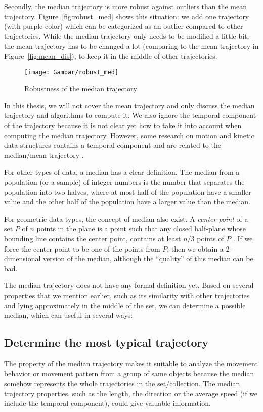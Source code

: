 Secondly, the median trajectory is more robust against outliers than the mean trajectory.
Figure~\ref{fig:robust_med} shows this situation: we add one trajectory (with purple color) which can be categorized as an outlier compared to other trajectories. 
While the median trajectory only needs to be modified a little bit, the mean trajectory has to be changed a lot (comparing to the mean trajectory in Figure~\ref{fig:mean_dis}), to keep it in the middle of other trajectories.

\begin{figure}
\centering
\texttt{[image: Gambar/robust\_med]}
\caption[Robustness of the median trajectory]{Robustness of the median trajectory} 
\end{figure}

In this thesis, we will not cover the mean trajectory and only discuss the median trajectory and algorithms to compute it.
We also ignore the temporal component of the trajectory because it is not clear yet how to take it into account when computing the median trajectory. 
However, some research on motion and kinetic data structures contains a temporal component and are related to the median/mean trajectory \cite{Agarwal:2003,Agarwal:1997}. 

For other types of data, a median has a clear definition.
The median from a population (or a sample) of integer numbers is the number that separates the population into two halves, where at most half of the population have a smaller value and the other half of the population have a larger value than the median. 

For geometric data types, the concept of median also exist.
A \textit{center point} of a set $P$ of $n$ points in the plane is a point such that any closed half-plane whose bounding line contains the center point, contains at least $n/3$ points of $P$ \cite{Amenta:2000}.
If we force the center point to be one of the points from $P$, then we obtain a 2-dimensional version of the median, although the ``quality'' of this median can be bad.

The median trajectory does not have any formal definition yet.
Based on several properties that we mention earlier, such as its similarity with other trajectories and lying approximately in the middle of the set, we can determine a possible median, which can useful in several ways:

\subsection{Determine the most typical trajectory}
The property of the median trajectory makes it suitable to analyze the movement behavior or movement pattern from a group of same objects because the median somehow represents the whole trajectories in the set/collection.
The median trajectory properties, such as the length, the direction or the average speed (if we include the temporal component), could give valuable information.

